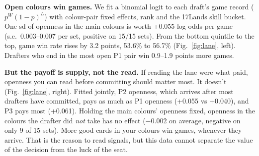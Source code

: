 \documentclass[10pt,letterpaper]{article}
\begin{document}
\textbf{Open colours win games.} We fit a binomial logit to each draft's game record ($p^W(1-p)^L$) with
colour-pair fixed effects, rank and the 17Lands skill bucket. One sd of openness in the main colours is worth
+0.055 log-odds per game (s.e.\ 0.003--0.007 per set, positive on 15/15 sets). From the bottom quintile to the top, game win rate
rises by 3.2 points, 53.6\% to 56.7\% (Fig.~\ref{fig:lane}, left). Drafters who end in the most open P1 pair win
0.9--1.9 points more games.

\textbf{But the payoff is supply, not the read.} If reading the lane were what paid, openness you can read before
committing should matter most. It doesn't (Fig.~\ref{fig:lane}, right). Fitted jointly, P2 openness, which arrives
after most drafters have committed, pays as much as P1 openness (+0.055 vs +0.040), and P3 pays most (+0.061).
Holding the main colours' openness fixed, openness in the colours the drafter did \emph{not} take has no effect
($-$0.002 on average, negative on only 9 of 15 sets). More good cards in your colours win games, whenever they
arrive. That is the reason to read signals, but this data cannot separate the value of the decision from the
luck of the seat.

\begin{table}[t]
\centering\small
\caption{Follow or force? Seat 0's deck score (mean GIH WR, \%, of the best colour pair's 23 best cards) over
2,000 simulated tables of real opened test packs. Seats 1--7 are PickNet bots in every arm. $\Delta$: difference
from \emph{follow}, paired on the same tables ($\pm$ s.e.).}
\label{tab:force}
\setlength{\tabcolsep}{3.0pt}
\end{table}
\end{document}
